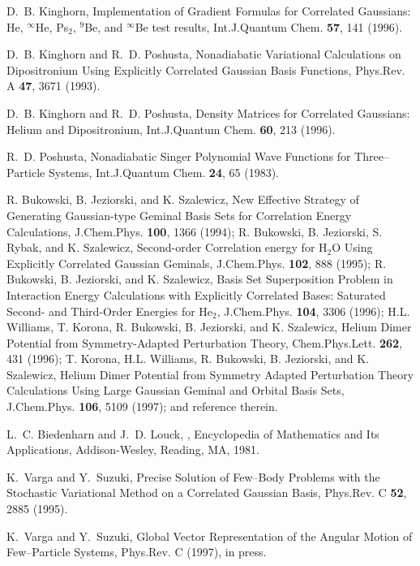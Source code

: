 \begin{thebibliography}{999}
D.~B. Kinghorn,
Implementation of Gradient Formulas for Correlated
Gaussians: He, $^{\infty}$He, Ps$_2$, $^9$Be, and $^{\infty}$Be
test results,
\newblock Int.J.Quantum Chem. {\bf 57}, 141 (1996).

D.~B. Kinghorn and R.~D. Poshusta,
Nonadiabatic Variational Calculations on Dipositronium
Using Explicitly Correlated Gaussian Basis Functions,
\newblock Phys.Rev. A {\bf 47}, 3671 (1993).

D.~B. Kinghorn and R.~D. Poshusta,
Density Matrices for Correlated Gaussians: Helium and
Dipositronium,
\newblock Int.J.Quantum Chem. {\bf 60}, 213 (1996).

R.~D. Poshusta,
Nonadiabatic Singer Polynomial Wave Functions for 
Three--Particle Systems,
\newblock Int.J.Quantum Chem. 
{\bf 24}, 65 (1983).

R. Bukowski, B. Jeziorski, and K. Szalewicz,
New Effective Strategy of Generating Gaussian-type Geminal
Basis Sets for Correlation Energy Calculations,
J.Chem.Phys. {\bf 100}, 1366 (1994);
R. Bukowski, B. Jeziorski, S. Rybak, and K. Szalewicz,
Second-order Correlation energy for H$_2$O Using
Explicitly Correlated Gaussian Geminals,
J.Chem.Phys. {\bf 102}, 888 (1995);
R. Bukowski, B. Jeziorski, and K. Szalewicz,
Basis Set Superposition Problem in Interaction Energy
Calculations with Explicitly Correlated Bases:
Saturated Second- and Third-Order Energies for He$_2$,
J.Chem.Phys. {\bf 104}, 3306 (1996);
H.L. Williams, T. Korona, R. Bukowski, B. Jeziorski, and K. Szalewicz,
Helium Dimer Potential from Symmetry-Adapted
Perturbation Theory,
Chem.Phys.Lett. {\bf 262}, 431 (1996);
T. Korona, H.L. Williams, R. Bukowski,
B. Jeziorski, and K. Szalewicz,
Helium Dimer Potential from Symmetry Adapted Perturbation Theory
Calculations Using Large Gaussian Geminal and Orbital Basis Sets,
J.Chem.Phys. {\bf 106}, 5109 (1997);
and reference therein.


L.~C. Biedenharn and J.~D. Louck,
,
\newblock Encyclopedia of Mathematics and Its Applications, Addison-{W}esley,
Reading, {MA}, 1981.

K.~Varga and Y.~Suzuki,
Precise Solution of Few--Body Problems with the
Stochastic Variational Method on a Correlated Gaussian Basis,
\newblock Phys.Rev. C {\bf 52}, 2885 (1995).


K.~Varga and Y.~Suzuki,
Global Vector Representation of the Angular Motion of
Few--Particle Systems,
\newblock Phys.Rev. C  (1997),
\newblock in press.


\end{thebibliography}
